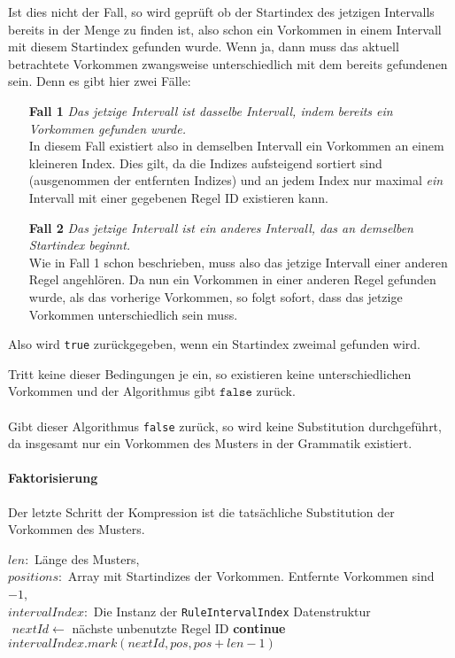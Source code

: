 Ist dies nicht der Fall, so wird geprüft ob der Startindex des jetzigen Intervalls bereits in der Menge zu finden ist, also schon ein Vorkommen in einem Intervall mit diesem Startindex gefunden wurde. Wenn ja, dann muss das aktuell betrachtete Vorkommen zwangsweise unterschiedlich mit dem bereits gefundenen sein. Denn es gibt hier zwei Fälle:
\begin{itemize}
    \item[\textbf{Fall 1}] \textit{Das jetzige Intervall ist dasselbe Intervall, indem bereits ein Vorkommen gefunden wurde.}\\
    In diesem Fall existiert also in demselben Intervall ein Vorkommen an einem kleineren Index. Dies gilt, da die Indizes aufsteigend sortiert sind (ausgenommen der entfernten Indizes) und an jedem Index nur maximal \textit{ein} Intervall mit einer gegebenen Regel ID existieren kann. 
    \item[\textbf{Fall 2}] \textit{Das jetzige Intervall ist ein anderes Intervall, das an demselben Startindex beginnt.}\\
    Wie in Fall 1 schon beschrieben, muss also das jetzige Intervall einer anderen Regel angehlören. Da nun ein Vorkommen in einer anderen Regel gefunden wurde, als das vorherige Vorkommen, so folgt sofort, dass das jetzige Vorkommen unterschiedlich sein muss. 
\end{itemize}   
Also wird \texttt{true} zurückgegeben, wenn ein Startindex zweimal gefunden wird.

Tritt keine dieser Bedingungen je ein, so existieren keine unterschiedlichen Vorkommen und der Algorithmus gibt $\texttt{false}$ zurück.\\\\
Gibt dieser Algorithmus \texttt{false} zurück, so wird keine Substitution durchgeführt, da insgesamt nur ein Vorkommen des Musters in der Grammatik existiert.

\newpage
\paragraph{Faktorisierung}

Der letzte Schritt der Kompression ist die tatsächliche Substitution der Vorkommen des Musters.
\begin{algorithm}
    \begin{algorithmic}
        \REQUIRE $len: $ Länge des Musters,\\ $positions: $ Array mit Startindizes der Vorkommen. Entfernte Vorkommen sind $-1$,\\ $intervalIndex: $ Die Instanz der \texttt{RuleIntervalIndex} Datenstruktur\\
        \STATE $ $
        \STATE $nextId \leftarrow$ nächste unbenutzte Regel ID
                \STATE \textbf{continue}
            \ENDIF
            \STATE $intervalIndex.mark(nextId, pos, pos + len - 1)$
        \ENDFOR
    \end{algorithmic}
\end{algorithm}

